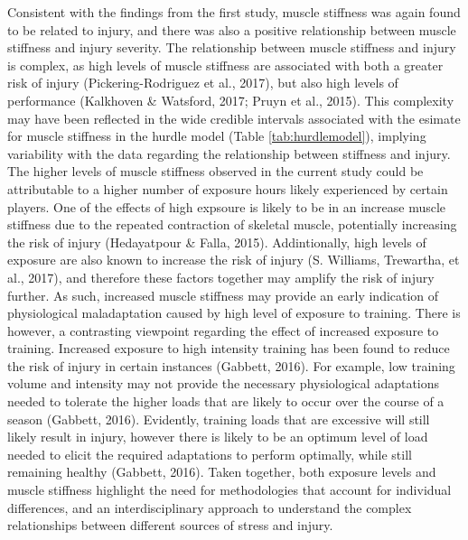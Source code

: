 \documentclass[
  english,
  man,floatsintext]{apa6}
\begin{document}
Consistent with the findings from the first study, muscle stiffness was again found to be related to injury, and there was also a positive relationship between muscle stiffness and injury severity.
The relationship between muscle stiffness and injury is complex, as high levels of muscle stiffness are associated with both a greater risk of injury (Pickering-Rodriguez et al., 2017), but also high levels of performance (Kalkhoven \& Watsford, 2017; Pruyn et al., 2015).
This complexity may have been reflected in the wide credible intervals associated with the esimate for muscle stiffness in the hurdle model (Table \ref{tab:hurdlemodel}), implying variability with the data regarding the relationship between stiffness and injury.
The higher levels of muscle stiffness observed in the current study could be attributable to a higher number of exposure hours likely experienced by certain players.
One of the effects of high expsoure is likely to be in an increase muscle stiffness due to the repeated contraction of skeletal muscle, potentially increasing the risk of injury (Hedayatpour \& Falla, 2015).
Addintionally, high levels of exposure are also known to increase the risk of injury (S. Williams, Trewartha, et al., 2017), and therefore these factors together may amplify the risk of injury further.
As such, increased muscle stiffness may provide an early indication of physiological maladaptation caused by high level of exposure to training.
There is however, a contrasting viewpoint regarding the effect of increased exposure to training.
Increased exposure to high intensity training has been found to reduce the risk of injury in certain instances (Gabbett, 2016).
For example, low training volume and intensity may not provide the necessary physiological adaptations needed to tolerate the higher loads that are likely to occur over the course of a season (Gabbett, 2016).
Evidently, training loads that are excessive will still likely result in injury, however there is likely to be an optimum level of load needed to elicit the required adaptations to perform optimally, while still remaining healthy (Gabbett, 2016).
Taken together, both exposure levels and muscle stiffness highlight the need for methodologies that account for individual differences, and an interdisciplinary approach to understand the complex relationships between different sources of stress and injury.
\end{document}
